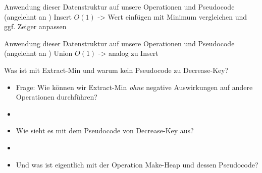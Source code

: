 \documentclass{beamer}
\newif\ifpauseswitch
\begin{document}
			\begin{frame}{Anwendung dieser Datenstruktur auf unsere Operationen und Pseudocode (angelehnt an \cite{CORMEN17})}
				Insert $O(1)$ -> Wert einf\"ugen mit Minimum vergleichen und ggf. Zeiger anpassen
				\ifpauseswitch
					\pause
				\fi
				
			\end{frame}
			
			\begin{frame}{Anwendung dieser Datenstruktur auf unsere Operationen und Pseudocode (angelehnt an \cite{CORMEN17})}
				Union $O(1)$ -> analog zu Insert
				\ifpauseswitch
					\pause
				\fi
				
			\end{frame}
	
	\begin{frame}{Was ist mit Extract-Min und warum kein Pseudocode zu Decrease-Key?}
		\begin{itemize}
			\item Frage: Wie k\"onnen wir Extract-Min \textit{ohne} negative Auswirkungen auf andere Operationen durchführen?
			\item[] %
			\item Wie sieht es mit dem Pseudocode von Decrease-Key aus?
			\item[] %
			\item Und was ist eigentlich mit der Operation Make-Heap und dessen Pseudocode?
		\end{itemize}
	\end{frame}
	
\end{document}
